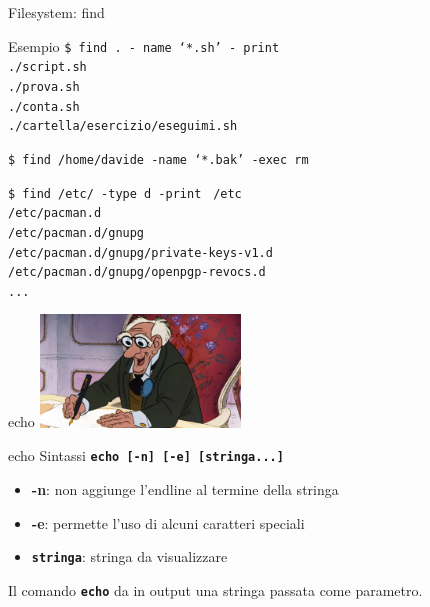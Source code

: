 \documentclass{beamer}
\begin{document}
    \begin{frame}{Filesystem: find}
        \small
        \begin{exampleblock}{Esempio}
            \texttt{\$ find . - name `*.sh' - print \\}
            \texttt{./script.sh \\
            ./prova.sh \\
            ./conta.sh \\
            ./cartella/esercizio/eseguimi.sh}

            \vspace{0.5cm}

            \texttt{\$ find /home/davide -name `*.bak' -exec rm {} \;}
            
            \vspace{0.5cm}

            \texttt{\$ find /etc/ -type d -print}
            \texttt{
                /etc \\
                /etc/pacman.d \\
                /etc/pacman.d/gnupg \\
                /etc/pacman.d/gnupg/private-keys-v1.d \\
                /etc/pacman.d/gnupg/openpgp-revocs.d \\
                ...
            }

        \end{exampleblock}
    \end{frame}

    \begin{frame}{echo}
        \centering
        \includegraphics[height=3cm, keepaspectratio]{images/george.png}

        \begin{block}{echo}
            Sintassi \texttt{\textbf{echo [-n] [-e] [stringa...]}}

            \begin{itemize}
                \item \textbf{-n}: non aggiunge l'endline al termine della stringa
                \item \textbf{-e}: permette l'uso di alcuni caratteri speciali
                \item \texttt{\textbf{stringa}}: stringa da visualizzare
            \end{itemize}

            Il comando \texttt{\textbf{echo}} da in output una stringa passata come parametro.
        \end{block}

        
    \end{frame}
\end{document}

